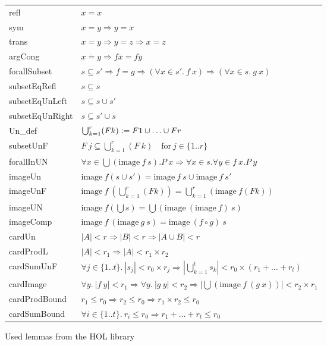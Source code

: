 \begin{figure}
\begin{center}
\begin{tabular}{l l}
refl & $x = x$ \\
sym & $x = y \Longrightarrow y = x$ \\
trans & $x = y \Longrightarrow y = z \Longrightarrow x = z$ \\
argCong & $\overline{x = y} \Longrightarrow f \overline{x} = f \overline{y}$ \\
forallSubset & $s \subseteq s' \Longrightarrow f = g \Longrightarrow (\forall x \in s'. \: f \: x) \Longrightarrow (\forall x \in s. \: g \: x)$ \\
subsetEqRefl & $s \subseteq s$ \\
subsetEqUnLeft & $s \subseteq s \cup s'$ \\
subsetEqUnRight & $s \subseteq s' \cup s$ \\
Un\_def & $\bigcup_{k=1}^r (F k) \vcentcolon= F 1 \cup \dots \cup F r$ \\
subsetUnF & $ F \: j \subseteq \bigcup_{k=1}^{r} \left( F \: k \right) \quad \text{for} \: j \in \{1..r\} $ \\
forallInUN & $ \forall x \in \bigcup \left( \text{image} \: f \: s \right). P \: x \Longrightarrow \forall x \in s. \forall y \in f \: x. P \: y $ \\
imageUn & $\text{image} \: f (s \cup s') = \text{image} \: f \: s \cup \text{image} \: f \: s'$ \\
imageUnF & $\text{image} \: f \: \left( \bigcup_{k=1}^r (F k) \right) = \bigcup_{k=1}^r (\text{image} \: f (F k))$ \\
imageUN & $\text{image} \: f \left( \bigcup s \right) = \bigcup \left( \text{image} \: (\text{image} \: f) \: s \right)$ \\
imageComp & $\text{image} \: f \: (\text{image} \: g \: s) = \text{image} \: (f \circ g) \: s$ \\
cardUn\footnotemark & $|A| < r \Longrightarrow |B| < r \Longrightarrow |A \cup B| < r$ \\
cardProdL\footnotemark[\value{footnote}] & $|A| < r_1 \Longrightarrow |A| < r_1 \times r_2$ \\
cardSumUnF\footnotemark[\value{footnote}] & $\forall j \in \{1..t\}. \: |s_j| < r_0 \times r_j \Longrightarrow \left| \bigcup_{k=1}^t s_k \right| < r_0 \times (r_1 + \dots + r_t)$ \\
cardImage\footnote[\value{footnote}] & $\forall y. \: |f \: y| < r_1 \Longrightarrow \forall y. \: |g \: y| < r_2 \Longrightarrow \left| \bigcup \left( \text{image} \: f \: (g \: x) \right) \right| < r_2 \times r_1$ \\
cardProdBound\footnote[\value{footnote}] & $r_1 \le r_0 \Longrightarrow r_2 \le r_0 \Longrightarrow r_1 \times r_2 \le r_0 $ \\
cardSumBound\footnote[\value{footnote}] & $\forall i \in \{1..t\}. \: r_i \le r_0 \Longrightarrow r_1 + \dots + r_t \le r_0$ \\
\end{tabular}
\end{center}
\caption{Used lemmas from the \ac{HOL} library}\label{fig:lemmas}
\end{figure}

